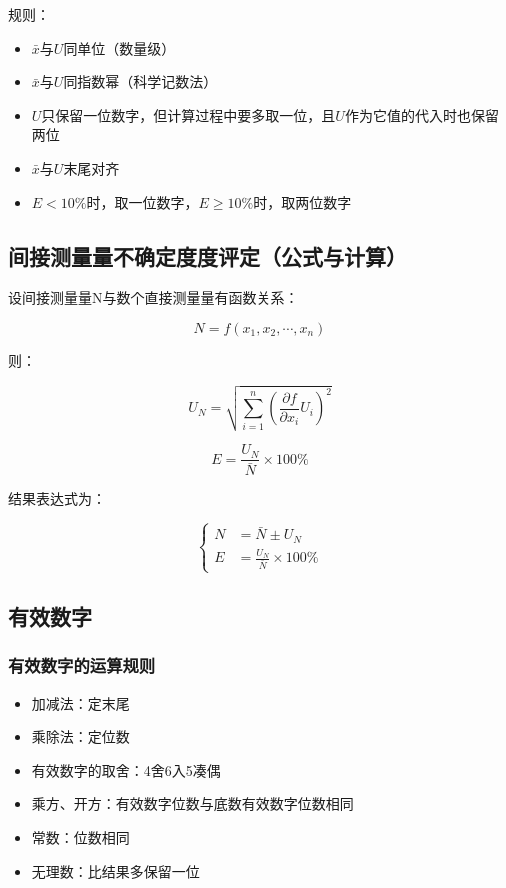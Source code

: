 \documentclass{article}
\begin{document}
规则：

\begin{itemize}
    \item $\bar{x}$与$U$同单位（数量级）
    \item $\bar{x}$与$U$同指数幂（科学记数法）
    \item $U$只保留一位数字，但计算过程中要多取一位，且$U$作为它值的代入时也保留两位
    \item $\bar{x}$与$U$末尾对齐
    \item $E < 10\%$时，取一位数字，$E \geq 10\%$时，取两位数字
\end{itemize}

\subsection{间接测量量不确定度度评定（公式与计算）}

设间接测量量N与数个直接测量量有函数关系：

\begin{equation}
    N = f(x_1, x_2, \cdots, x_n)
\end{equation}

则：

\begin{equation}
    U_N = \sqrt{\sum_{i=1}^{n} \left(\frac{\partial f}{\partial x_i} U_i\right)^2}
\end{equation}

\begin{equation}
    E = \frac{U_N}{\bar{N}} \times 100\%
\end{equation}

结果表达式为：

\begin{equation}
    \left\{
    \begin{aligned}
        N &= \bar{N} \pm U_N \\
        E &= \frac{U_N}{\bar{N}} \times 100\%
    \end{aligned}
    \right.
\end{equation}

\subsection{有效数字}

\subsubsection{有效数字的运算规则}

\begin{itemize}
    \item 加减法：定末尾
    \item 乘除法：定位数
    \item 有效数字的取舍：4舍6入5凑偶
    \item 乘方、开方：有效数字位数与底数有效数字位数相同
    \item 常数：位数相同
    \item 无理数：比结果多保留一位
\end{itemize}
\end{document}
